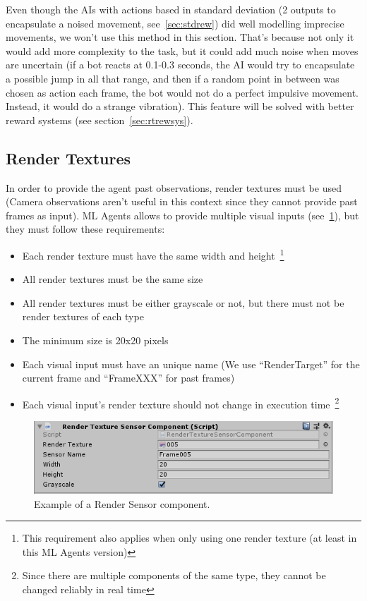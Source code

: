 Even though the AIs with actions based in standard deviation (2 outputs to encapsulate a noised movement, see~\ref{sec:stdrew}) did well modelling imprecise movements, we won't use this method in this section. That's because not only it would add more complexity to the task, but it could add much noise when moves are uncertain (if a bot reacts at 0.1-0.3 seconds, the AI would try to encapsulate a possible jump in all that range, and then if a random point in between was chosen as action each frame, the bot would not do a perfect impulsive movement. Instead, it would do a strange vibration). This feature will be solved with better reward systems (see section~\ref{sec:rtrewsys}).

\subsection{Render Textures}

In order to provide the agent past observations, render textures must be used (Camera observations aren't useful in this context since they cannot provide past frames as input). ML Agents allows to provide multiple visual inputs (see~\ref{fig:rendersens}), but they must follow these requirements:

\begin{itemize}
 \item Each render texture must have the same width and height~\footnote{This requirement also applies when only using one render texture (at least in this ML Agents version)}
 \item All render textures must be the same size
 \item All render textures must be either grayscale or not, but there must not be render textures of each type
 \item The minimum size is 20x20 pixels
 \item Each visual input must have an unique name (We use ``RenderTarget'' for the current frame and ``FrameXXX'' for past frames)
 \item Each visual input's render texture should not change in execution time~\footnote{Since there are multiple components of the same type, they cannot be changed reliably in real time}
\end{itemize}

\begin{figure}[h]
  \centering
		\includegraphics[width=.6\textwidth]{img/rendersensor.png}
  \caption{Example of a Render Sensor component.}
  \label{fig:rendersens}
\end{figure}

